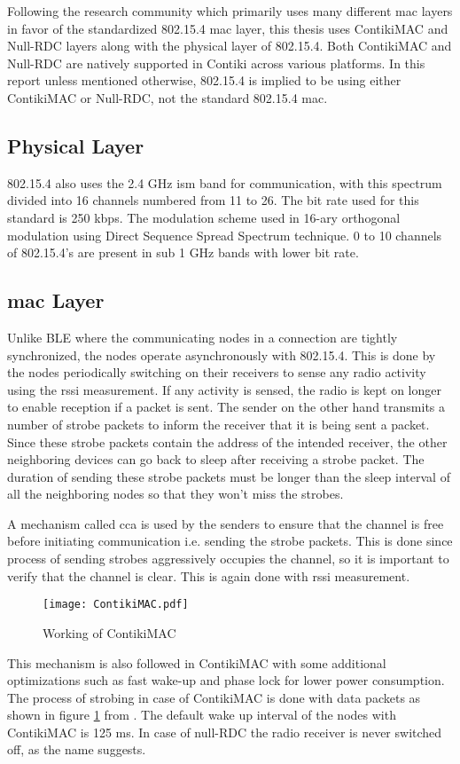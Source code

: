 Following the research community which primarily uses many different \gls{mac} layers in favor of the standardized 802.15.4 \gls{mac} layer, this thesis uses ContikiMAC and Null-RDC layers along with the physical layer of 802.15.4. Both ContikiMAC and Null-RDC are natively supported in Contiki across various platforms. In this report unless mentioned otherwise, 802.15.4 is implied to be using either ContikiMAC or Null-RDC, not the standard 802.15.4 \gls{mac}.

\subsection{Physical Layer}
802.15.4 also uses the 2.4 GHz \gls{ism} band for communication, with this spectrum divided into 16 channels numbered from 11 to 26. The bit rate used for this standard is 250 kbps. The modulation scheme used in 16-ary orthogonal modulation using Direct Sequence Spread Spectrum technique. 0 to 10 channels of 802.15.4's are present in sub 1 GHz bands with lower bit rate.

\subsection{\texorpdfstring{\gls{mac}}{MAC} Layer}


Unlike BLE where the communicating nodes in a connection are tightly synchronized, the nodes operate asynchronously with 802.15.4. This is done by the nodes periodically switching on their receivers to sense any radio activity using the \gls{rssi} measurement. If any activity is sensed, the radio is kept on longer to enable reception if a packet is sent. The sender on the other hand transmits a number of strobe packets to inform the receiver that it is being sent a packet. Since these strobe packets contain the address of the intended receiver, the other neighboring devices can go back to sleep after receiving a strobe packet. The duration of sending these strobe packets must be longer than the sleep interval of all the neighboring nodes so that they won't miss the strobes.

A mechanism called \gls{cca} is used by the senders to ensure that the channel is free before initiating communication i.e. sending the strobe packets. This is done since process of sending strobes aggressively occupies the channel, so it is important to verify that the channel is clear. This is again done with \gls{rssi} measurement.

\begin{figure}[h]
\centering
\texttt{[image: ContikiMAC.pdf]}
\caption{Working of ContikiMAC}
\label{fig:ContikiMAC}
\end{figure}

This mechanism is also followed in ContikiMAC with some additional optimizations such as fast wake-up and phase lock for lower power consumption. The process of strobing in case of ContikiMAC is done with data packets as shown in figure \ref{fig:ContikiMAC} from \cite{Dunkels2011}. The default wake up interval of the nodes with ContikiMAC is 125 ms. In case of null-RDC the radio receiver is never switched off, as the name suggests.
